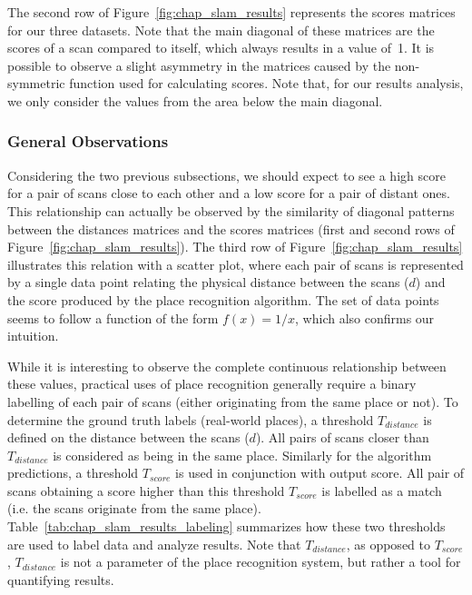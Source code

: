 The second row of Figure~\ref{fig:chap_slam_results} represents the scores matrices for our three datasets. Note that the main diagonal of these matrices are the scores of a scan compared to itself, which always results in a value of~1. It is possible to observe a slight asymmetry in the matrices caused by the non-symmetric function used for calculating scores. Note that, for our results analysis, we only consider the values from the area below the main diagonal.


\subsubsection{General Observations}
\label{ssec:chap_slam_results_evaluation}

Considering the two previous subsections, we should expect to see a high score for a pair of scans close to each other and a low score for a pair of distant ones. This relationship can actually be observed by the similarity of diagonal patterns between the distances matrices and the scores matrices (first and second rows of Figure~\ref{fig:chap_slam_results}). The third row of Figure~\ref{fig:chap_slam_results} illustrates this relation with a scatter plot, where each pair of scans is represented by a single data point relating the physical distance between the scans ($d$) and the score produced by the place recognition algorithm. The set of data points seems to follow a function of the form $f(x) = 1 / x$, which also confirms our intuition.

While it is interesting to observe the complete continuous relationship between these values, practical uses of place recognition generally require a binary labelling of each pair of scans (either originating from the same place or not). To determine the ground truth labels (real-world places), a threshold $T_{distance}$ is defined on the distance between the scans ($d$). All pairs of scans closer than $T_{distance}$ is considered as being in the same place. Similarly for the algorithm predictions, a threshold $T_{score}$ is used in conjunction with output score. All pair of scans obtaining a score higher than this threshold $T_{score}$ is labelled as a match (i.e. the scans originate from the same place). Table~\ref{tab:chap_slam_results_labeling} summarizes how these two thresholds are used to label data and analyze results. Note that $T_{distance}$, as opposed to $T_{score}$, $T_{distance}$ is not a parameter of the place recognition system, but rather a tool for quantifying results. 

